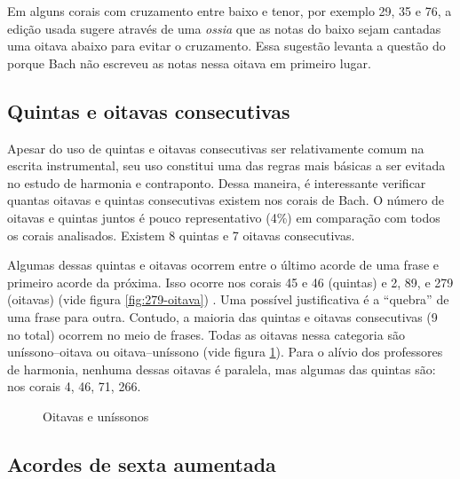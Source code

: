 Em alguns corais com cruzamento entre baixo e tenor, por exemplo 29,
35 e 76, a edição usada sugere através de uma \textit{ossia} que as
notas do baixo sejam cantadas uma oitava abaixo para evitar o
cruzamento. Essa sugestão levanta a questão do porque Bach não
escreveu as notas nessa oitava em primeiro lugar.

\subsection{Quintas e oitavas consecutivas}
\label{sec:quintas-e-oitavas}

Apesar do uso de quintas e oitavas consecutivas ser relativamente
comum na escrita instrumental, seu uso constitui uma das regras mais
básicas a ser evitada no estudo de harmonia e contraponto. Dessa
maneira, é interessante verificar quantas oitavas e quintas
consecutivas existem nos corais de Bach. O número de oitavas e quintas
juntos é pouco representativo (4\%) em comparação com todos os corais
analisados. Existem 8 quintas e 7 oitavas consecutivas.

Algumas dessas quintas e oitavas ocorrem entre o último acorde de uma
frase e primeiro acorde da próxima.  Isso
ocorre nos corais 45 e 46 (quintas) e 2, 89, e 279 (oitavas) (vide
figura \ref{fig:279-oitava}) . Uma
possível justificativa é a ``quebra'' de uma frase para
outra. Contudo, a maioria das quintas e oitavas consecutivas (9 no
total) ocorrem no meio de frases. Todas as oitavas nessa categoria são
uníssono--oitava ou oitava--uníssono (vide figura
\ref{fig:oitavas-e-unissonos}).  Para o alívio dos professores de harmonia, nenhuma dessas
oitavas é paralela, mas algumas das quintas são: nos corais 4, 46, 71,
266.

\begin{figure}
  \centering
  \qquad
  \qquad
  \caption{Oitavas e uníssonos}
  \label{fig:oitavas-e-unissonos}
\end{figure}

\subsection{Acordes de sexta aumentada}
\label{sec:acordes-de-sexta}

